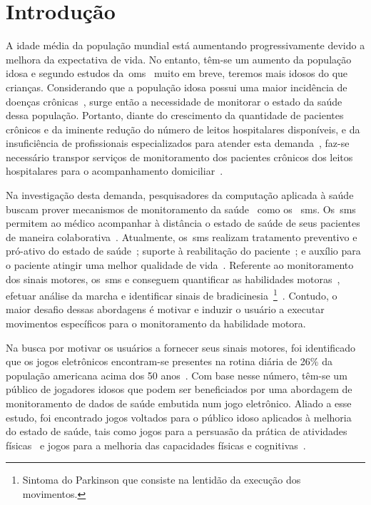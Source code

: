 \chapter{Introdu\c{c}\~{a}o} \label{chapter:intro}

A idade média da população mundial está aumentando progressivamente devido a melhora da expectativa de vida. No entanto, têm-se um aumento da população idosa e segundo estudos da~\ac{oms}~\cite{ageing2011} muito em breve, teremos mais idosos do que crianças. Considerando que a população idosa possui uma maior incidência de doenças crônicas~\cite{prevcronica2009}, surge então a necessidade de monitorar o estado da saúde dessa população. Portanto, diante do crescimento da quantidade de pacientes crônicos e da iminente redução do número de leitos hospitalares disponíveis, e da insuficiência de profissionais especializados para atender esta demanda~\cite{healthmonitoring2013}, faz-se necessário transpor serviços de monitoramento dos pacientes crônicos dos leitos hospitalares para o acompanhamento domiciliar~\cite{homecarebrazil2011}. 

Na investigação desta demanda, pesquisadores da computação aplicada à saúde buscam prover mecanismos de monitoramento da saúde~\cite{healthmonitoring2013,bardram2010,aarhus_negotiating_2010} como os ~\ac{sms}. Os~\ac{sms} permitem ao médico acompanhar à distância o estado de saúde de seus pacientes de maneira colaborativa~\cite{healthmonitoring2013}. Atualmente, os~\ac{sms} realizam tratamento preventivo e pró-ativo do estado de saúde~\cite{bardram2010}; suporte à reabilitação do paciente~\cite{sacbespoke2014}; e auxílio para o paciente atingir uma melhor qualidade de vida~\cite{sacsvmhms2014}. Referente ao monitoramento dos sinais motores, os~\ac{sms} e conseguem quantificar as habilidades motoras~\cite{manumeterjbhi2014,patel_monitoring_2009}, efetuar análise da marcha \cite{robotgait2014} e identificar sinais de bradicinesia~\footnote{Sintoma do Parkinson que consiste na lentidão da execução dos movimentos.}~\cite{ambulatoryparkinson2010}. Contudo, o maior desafio dessas abordagens é motivar e induzir o usuário a executar movimentos específicos para o monitoramento da habilidade motora.

Na busca por motivar os usuários a fornecer seus sinais motores, foi identificado que os jogos eletrônicos encontram-se presentes na rotina diária de 26\% da população americana acima dos 50 anos~\cite{esa2016}. Com base nesse número, têm-se um público de jogadores idosos que podem ser beneficiados por uma abordagem de monitoramento de dados de saúde embutida num jogo eletrônico. Aliado a esse estudo, foi encontrado jogos voltados para o público idoso aplicados à melhoria do estado de saúde, tais como jogos para a persuasão da prática de atividades físicas~\cite{seriousgameolder2015} e jogos para a melhoria das capacidades físicas e cognitivas~\cite{arntzen2011}. 

